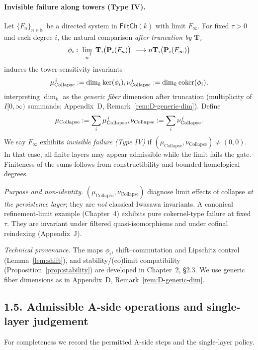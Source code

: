 \documentclass[11pt]{article}
\numberwithin{equation}{section}
\theoremstyle{definition}
\providecommand{\n}{\unskip\space}
\begin{document}
\paragraph{Invisible failure along towers (Type IV).}
Let $\{F_n\}_{n\in\mathbb{N}}$ be a directed system in $\mathsf{FiltCh}(k)$ with limit $F_\infty$. For fixed $\tau>0$ and each degree $i$, the natural comparison \emph{after truncation by $\mathbf{T}_\tau$}
\[
\phi_i:\ \varinjlim_{n}\ \mathbf{T}_\tau\!\big(\mathbf{P}_i(F_n)\big)\ \longrightarrow\\n\mathbf{T}_\tau\!\big(\mathbf{P}_i(F_\infty)\big)
\]
induces the tower-sensitivity invariants
\[
\mu_{\mathrm{Collapse}}^{\,i}:=\dim_k\ker(\phi_i),\qquad\n\nu_{\mathrm{Collapse}}^{\,i}:=\dim_k\mathrm{coker}(\phi_i),
\]
interpreting $\dim_k$ as the \emph{generic fiber} dimension after truncation (multiplicity of $I[0,\infty)$ summands; Appendix~D, Remark~\ref{rem:D-generic-dim}). Define
\[
\mu_{\mathrm{Collapse}}:=\sum_i \mu_{\mathrm{Collapse}}^{\,i},\qquad\n\nu_{\mathrm{Collapse}}:=\sum_i \nu_{\mathrm{Collapse}}^{\,i}.
\]
We say $F_\infty$ exhibits \emph{invisible failure (Type IV)} if $(\mu_{\mathrm{Collapse}},\nu_{\mathrm{Collapse}})\neq (0,0)$. In that case, all finite layers may appear admissible while the limit fails the gate. Finiteness of the sums follows from constructibility and bounded homological degrees.

\medskip
\noindent\emph{Purpose and non-identity.} $(\mu_{\mathrm{Collapse}},\nu_{\mathrm{Collapse}})$ diagnose limit effects of collapse \emph{at the persistence layer}; they are \emph{not} classical Iwasawa invariants. A canonical refinement-limit example (Chapter~4) exhibits pure cokernel-type failure at fixed~$\tau$. They are invariant under filtered quasi-isomorphisms and under cofinal reindexing (Appendix~J).

\medskip
\noindent\emph{Technical provenance.} The maps $\phi_i$, shift–commutation and Lipschitz control (Lemma~\ref{lem:shift}), and stability/(co)limit compatibility (Proposition~\ref{prop:stability}) are developed in Chapter~2, §2.3. We use generic fiber dimensions as in Appendix~D, Remark~\ref{rem:D-generic-dim}.

\subsection*{1.5. Admissible A-side operations and single-layer judgement}
For completeness we record the permitted A-side steps and the single-layer policy.
\end{document}
